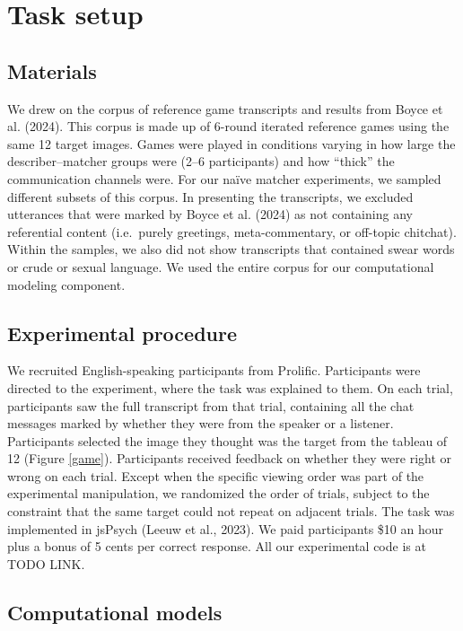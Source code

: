 \documentclass[10pt, letterpaper]{article}
\begin{document}
\section{Task setup}\label{task-setup}

\subsection{Materials}\label{materials}

We drew on the corpus of reference game transcripts and results from
Boyce et al. (2024). This corpus is made up of 6-round iterated
reference games using the same 12 target images. Games were played in
conditions varying in how large the describer--matcher groups were (2--6
participants) and how ``thick'' the communication channels were. For our
naïve matcher experiments, we sampled different subsets of this corpus.
In presenting the transcripts, we excluded utterances that were marked
by Boyce et al. (2024) as not containing any referential content
(i.e.~purely greetings, meta-commentary, or off-topic chitchat). Within
the samples, we also did not show transcripts that contained swear words
or crude or sexual language. We used the entire corpus for our
computational modeling component.

\subsection{Experimental procedure}\label{experimental-procedure}

We recruited English-speaking participants from Prolific. Participants
were directed to the experiment, where the task was explained to them.
On each trial, participants saw the full transcript from that trial,
containing all the chat messages marked by whether they were from the
speaker or a listener. Participants selected the image they thought was
the target from the tableau of 12 (Figure \ref{game}). Participants
received feedback on whether they were right or wrong on each trial.
Except when the specific viewing order was part of the experimental
manipulation, we randomized the order of trials, subject to the
constraint that the same target could not repeat on adjacent trials. The
task was implemented in jsPsych (Leeuw et al., 2023). We paid
participants \$10 an hour plus a bonus of 5 cents per correct response.
All our experimental code is at TODO LINK.

\subsection{Computational models}\label{computational-models}
\end{document}
